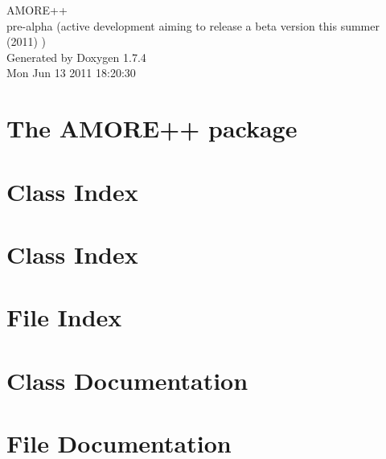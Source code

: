 \documentclass[a4paper]{book}
\begin{document}
\hypersetup{pageanchor=false}
\begin{titlepage}
\vspace*{7cm}
\begin{center}
{\Large AMORE++ \\[1ex]\large pre-\/alpha (active development aiming to release a beta version this summer (2011) ) }\\
\vspace*{1cm}
{\large Generated by Doxygen 1.7.4}\\
\vspace*{0.5cm}
{\small Mon Jun 13 2011 18:20:30}\\
\end{center}
\end{titlepage}
\clearemptydoublepage
{}
\tableofcontents
\clearemptydoublepage
{}
\hypersetup{pageanchor=true}
\chapter{The AMORE++ package}
\label{index}\hypertarget{index}{}
\chapter{Class Index}

\chapter{Class Index}

\chapter{File Index}

\chapter{Class Documentation}













\chapter{File Documentation}

























\printindex
\end{document}
